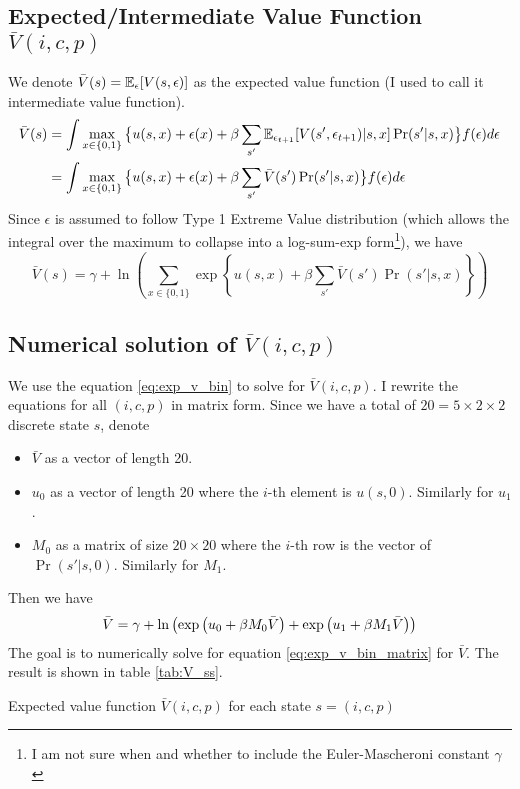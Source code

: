 \documentclass[12pt]{article}[margin=1in]
\begin{document}
\subsection{Expected/Intermediate Value Function $\bar{V}(i,c,p)$}
We denote $\bar{V}(s) = \mathbb{E}_{\epsilon}[V(s,\epsilon)]$ as the expected value function (I used to call it intermediate value function).
\begin{equation}\label{eq:exp_v}
    \begin{split}
        \bar{V}(s) & =\int \max_{x \in \{0,1\}} \big\{ u(s,x) + \epsilon(x)+ \beta \sum_{s'}\mathbb{E}_{\epsilon_{t+1}}[V(s',\epsilon_{t+1})|s,x] \Pr(s'|s,x)\big\}  f(\epsilon) d\epsilon \\
                   & =\int \max_{x \in \{0,1\}} \big\{ u(s,x) + \epsilon(x)+ \beta \sum_{s'}\bar{V}(s') \Pr(s'|s,x)\big\}  f(\epsilon) d\epsilon
    \end{split}
\end{equation}
Since $\epsilon$ is assumed to follow Type 1 Extreme Value distribution (which allows the integral over the maximum to collapse into a log-sum-exp form\footnote{I am not sure when and whether to include the Euler-Mascheroni constant $\gamma$}), we have
\begin{equation} \label{eq:exp_v_bin}
    \bar{V}(s) = \gamma+\ln\left(\sum_{x \in \{0,1\}} \exp\left\{ u(s,x) + \beta \sum_{s'}\bar{V}(s') \Pr(s'|s,x)\right\}\right)
\end{equation}

\subsection{Numerical solution of $\bar{V}(i,c,p)$}
We use the equation \ref{eq:exp_v_bin} to solve for $\bar{V}(i,c,p)$.  I rewrite the equations for all $(i,c,p)$ in matrix form. Since we have a total of $20=5\times 2\times 2$ discrete state $s$, denote
\begin{itemize}
    \item $\bar{V}$ as a vector of length 20.
    \item $u_0$ as a vector of length 20 where the $i$-th element is $u(s,0)$. Similarly for $u_1$.
    \item $M_0$ as a matrix of size $20 \times 20$ where the $i$-th row is the vector of $\Pr(s'|s,0)$. Similarly for $M_1$.
\end{itemize}
Then we have
\begin{equation}\label{eq:exp_v_bin_matrix}
    \bar{V}= \gamma + \ln\left(\exp\left(u_0 + \beta M_0 \bar{V}\right) + \exp\left(u_1 + \beta M_1 \bar{V}\right)\right)
\end{equation}
The goal is to numerically solve for equation \ref{eq:exp_v_bin_matrix} for $\bar{V}$. The result is shown in table \ref{tab:V_ss}.
\newpage
\begin{table}
    \centering
    
    \caption{Expected value function $\bar{V}(i,c,p)$ for each state $s=(i,c,p)$}
    \label{tab:V_ss}
\end{table}
\newpage
\end{document}
